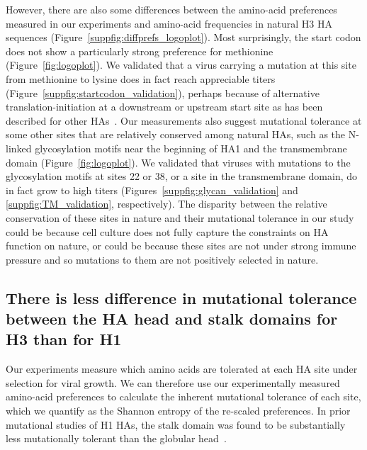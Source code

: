 \documentclass[9pt,twocolumn,twoside]{pnas-new}
\begin{document}
However, there are also some differences between the amino-acid preferences measured in our experiments and amino-acid frequencies in natural H3 HA sequences (Figure~\ref{suppfig:diffprefs_logoplot}).
Most surprisingly, the start codon does not show a particularly strong preference for methionine (Figure~\ref{fig:logoplot}).
We validated that a virus carrying a mutation at this site from methionine to lysine does in fact reach appreciable titers (Figure~\ref{suppfig:startcodon_validation}), perhaps because of alternative translation-initiation at a downstream or upstream start site as has been described for other HAs~\cite{girard2011upstream}.
Our measurements also suggest mutational tolerance at some other sites that are relatively conserved among natural HAs, such as the N-linked glycosylation motifs near the beginning of HA1 and the transmembrane domain (Figure~\ref{fig:logoplot}).
We validated that viruses with mutations to the glycosylation motifs at sites 22 or 38, or a site in the transmembrane domain, do in fact grow to high titers (Figures~\ref{suppfig:glycan_validation} and \ref{suppfig:TM_validation}, respectively).
The disparity between the relative conservation of these sites in nature and their mutational tolerance in our study could be because cell culture does not fully capture the constraints on HA function on nature, or could be because these sites are not under strong immune pressure and so mutations to them are not positively selected in nature.

\subsection*{There is less difference in mutational tolerance between the HA head and stalk domains for H3 than for H1}
Our experiments measure which amino acids are tolerated at each HA site under selection for viral growth.
We can therefore use our experimentally measured amino-acid preferences to calculate the inherent mutational tolerance of each site, which we quantify as the Shannon entropy of the re-scaled preferences.
In prior mutational studies of H1 HAs, the stalk domain was found to be substantially less mutationally tolerant than the globular head~\cite{thyagarajan2014inherent,wu2014high,doud2016accurate,heaton2013genome}.
\end{document}
